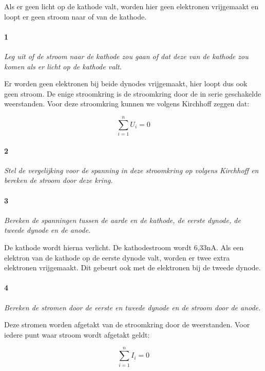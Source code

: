 Als er geen licht op de kathode valt, worden hier geen elektronen
vrijgemaakt en loopt er geen stroom naar of van de kathode. 

\paragraph{1}

\textit{Leg uit of de stroom naar de kathode zou gaan of dat deze
van de kathode zou komen als er licht op de kathode valt.}

Er worden geen elektronen bij beide dynodes vrijgemaakt, hier loopt
dus ook geen stroom. De enige stroomkring is de stroomkring door de
in serie geschakelde weerstanden. Voor deze stroomkring kunnen we 
volgens Kirchhoff zeggen dat: 

\begin{equation}
    \sum_{i=1}^n U_{i} = 0
\end{equation}

\paragraph{2}

\textit{Stel de vergelijking voor de spanning in deze stroomkring
op volgens Kirchhoff en bereken de stroom door deze kring.}

\paragraph{3}

\textit{Bereken de spanningen tussen de aarde en de kathode, de eerste
dynode, de tweede dynode en de anode.}

De kathode wordt hierna verlicht. De kathodestroom wordt 6,33nA.
Als een elektron van de kathode op de eerste dynode valt, worden er
twee extra elektronen vrijgemaakt. Dit gebeurt ook met de elektronen
bij de tweede dynode.

\paragraph{4}

\textit{Bereken de stromen door de eerste en tweede dynode en de stroom
door de anode.}

Deze stromen worden afgetakt van de stroomkring door de weerstanden. 
Voor iedere punt waar stroom wordt afgetakt geldt:

\begin{equation}
    \sum_{i=1}^n I_{i} = 0
\end{equation}

